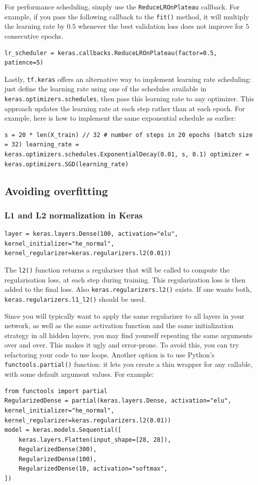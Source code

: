 \documentclass[12pt, letterpaper]{article}
\theoremstyle{definition}
\let\cd\lstinline
\begin{document}
For performance scheduling, simply use the \cd+ReduceLROnPlateau+ callback. For example, if you pass the following callback to the \cd+fit()+ method, it will multiply the learning rate by $0.5$ whenever the best validation loss does not improve for $5$ consecutive epochs.
\begin{lstlisting}
lr_scheduler = keras.callbacks.ReduceLROnPlateau(factor=0.5, patience=5)
\end{lstlisting}
Lastly, \cd+tf.keras+ offers an alternative way to implement learning rate scheduling: just define the learning rate using one of the schedules available in \cd+keras.optimizers.schedules+, then pass this learning rate to any optimizer. This approach updates the learning rate at each step rather than at each epoch. For example, here is how to implement the same exponential schedule as earlier:
\begin{lstlisting}
s = 20 * len(X_train) // 32 # number of steps in 20 epochs (batch size = 32) learning_rate = keras.optimizers.schedules.ExponentialDecay(0.01, s, 0.1) optimizer = keras.optimizers.SGD(learning_rate)
\end{lstlisting}
\subsection{Avoiding overfitting}
\subsubsection{L1 and L2 normalization in Keras}
\begin{lstlisting}
layer = keras.layers.Dense(100, activation="elu", kernel_initializer="he_normal", kernel_regularizer=keras.regularizers.l2(0.01))
\end{lstlisting}
The \cd+l2()+ function returns a regulariser that will be called to compute the regularisation loss, at each step during training. This regularization loss is then added to the final loss. Also \cd+keras.regularizers.l2()+ exists. If one wants both, \cd+keras.regularizers.l1_l2()+ should be used.

Since you will typically want to apply the same regularizer to all layers in your network, as well as the same activation function and the same initialization strategy in all hidden layers, you may find yourself repeating the same arguments over and over. This makes it ugly and error-prone. To avoid this, you can try refactoring your code to use loops. Another option is to use Python's \cd+functools.partial()+ function: it lets you create a thin wrapper for any callable, with some default argument values. For example:
\begin{lstlisting}
from functools import partial
RegularizedDense = partial(keras.layers.Dense, activation="elu", kernel_initializer="he_normal", kernel_regularizer=keras.regularizers.l2(0.01))
model = keras.models.Sequential([
	keras.layers.Flatten(input_shape=[28, 28]),
    RegularizedDense(300),
    RegularizedDense(100),
    RegularizedDense(10, activation="softmax",
])
\end{lstlisting}
\end{document}
